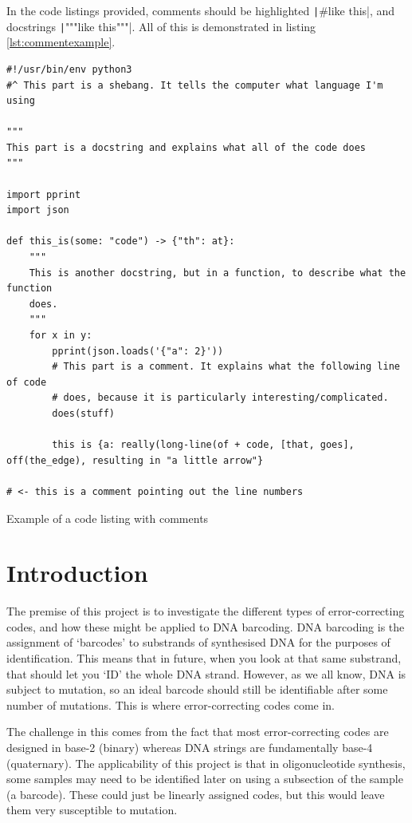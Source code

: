 \documentclass[a4paper,11pt]{article}
\newenvironment{longlisting}
{\addvspace{\baselineskip}\captionsetup{type=listing}}
{\addvspace{\baselineskip}}
\begin{document}
    In the code listings provided, comments should be highlighted
    \texttt|#like this|, and docstrings
    \texttt|"""like this"""|. All of this is demonstrated in listing
    \ref{lst:commentexample}.

\begin{longlisting}
\begin{verbatim}
#!/usr/bin/env python3
#^ This part is a shebang. It tells the computer what language I'm using

"""
This part is a docstring and explains what all of the code does
"""

import pprint
import json

def this_is(some: "code") -> {"th": at}:
    """
    This is another docstring, but in a function, to describe what the function
    does.
    """
    for x in y:
        pprint(json.loads('{"a": 2}'))
        # This part is a comment. It explains what the following line of code
        # does, because it is particularly interesting/complicated.
        does(stuff)

        this is {a: really(long-line(of + code, [that, goes], off(the_edge), resulting in "a little arrow"}

# <- this is a comment pointing out the line numbers
\end{verbatim}
\caption{Example of a code listing with comments}\label{lst:commentexample}
\end{longlisting}

    \section{Introduction}
    The premise of this project is to investigate the different types of
    error-correcting codes, and how these might be applied to DNA barcoding. DNA
    barcoding is the assignment of `barcodes' to substrands of synthesised DNA
    for the purposes of identification. This means that in future, when you look
    at that same substrand, that should let you `ID' the whole DNA strand.
    However, as we all know, DNA is subject to mutation, so an ideal barcode
    should still be identifiable after some number of mutations. This is where
    error-correcting codes come in.


    The challenge in this comes from the fact that most error-correcting codes
    are designed in base-2 (binary) whereas DNA strings are fundamentally
    base-4 (quaternary). The applicability of this project is that in
    oligonucleotide synthesis, some samples may need to be identified later on
    using a subsection of the sample (a barcode). These could just be linearly
    assigned codes, but this would leave them very susceptible to mutation.
\end{document}

